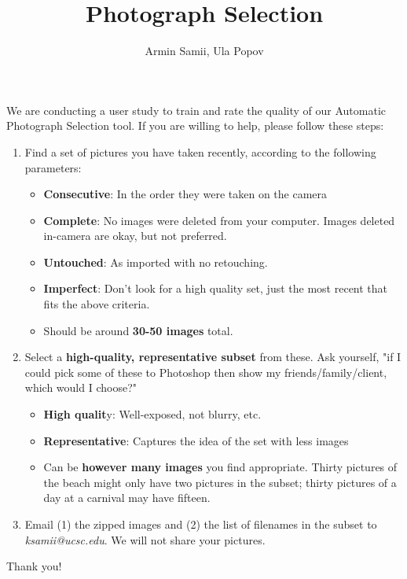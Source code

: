 \documentclass[10pt,a4paper]{article}
\begin{document}
\title{Photograph Selection}
\author{Armin Samii, Ula Popov}
\maketitle
We are conducting a user study to train and rate the quality of our Automatic Photograph Selection tool. If you are willing to help, please follow these steps:

\begin{enumerate}
\item Find a set of pictures you have taken recently, according to the following parameters:
	\begin{itemize}
	\item \textbf{Consecutive}: In the order they were taken on the camera
	\item \textbf{Complete}: No images were deleted from your computer. Images deleted in-camera are okay, but not preferred.
	\item \textbf{Untouched}: As imported with no retouching.
	\item \textbf{Imperfect}: Don't look for a high quality set, just the most recent that fits the above criteria.
	\item Should be around \textbf{30-50 images} total.
	\end{itemize}
\item Select a \textbf{high-quality, representative subset} from these. Ask yourself, "if I could pick some of these to Photoshop then show my friends/family/client, which would I choose?"
	\begin{itemize}
	\item \textbf{High qualit}y: Well-exposed, not blurry, etc.
	\item \textbf{Representative}: Captures the idea of the set with less images
	\item Can be \textbf{however many images} you find appropriate. Thirty pictures of the beach might only have two pictures in the subset; thirty pictures of a day at a carnival may have fifteen.
	\end{itemize}
\item Email (1) the zipped images and (2) the list of filenames in the subset to \textit{ksamii@ucsc.edu}. We will not share your pictures.
\end{enumerate}

Thank you!
\end{document}
